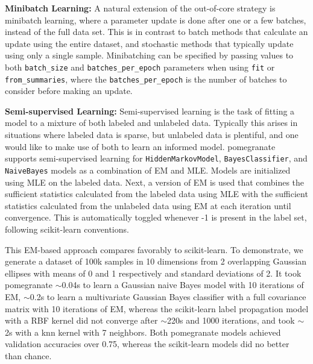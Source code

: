 \documentclass{article}
\newcommand{\code}[1]{\colorbox{light-gray}{\texttt{#1}}}
\begin{document}
\vspace{1em}\noindent\textbf{Minibatch Learning:} A natural extension of the out-of-core strategy is minibatch learning, where a parameter update is done after one or a few batches, instead of the full data set. This is in contrast to batch methods that calculate an update using the entire dataset, and stochastic methods that typically update using only a single sample. Minibatching can be specified by passing values to both \code{batch\_size} and \code{batches\_per\_epoch} parameters when using \code{fit} or \code{from\_summaries}, where the \code{batches\_per\_epoch} is the number of batches to consider before making an update.

\vspace{1em}\noindent\textbf{Semi-supervised Learning:} Semi-supervised learning is the task of fitting a model to a mixture of both labeled and unlabeled data. Typically this arises in situations where labeled data is sparse, but unlabeled data is plentiful, and one would like to make use of both to learn an informed model. pomegranate supports semi-supervised learning for \code{HiddenMarkovModel}, \code{BayesClassifier}, and \code{NaiveBayes} models as a combination of EM and MLE. Models are initialized using MLE on the labeled data. Next, a version of EM is used that combines the sufficient statistics calculated from the labeled data using MLE with the sufficient statistics calculated from the unlabeled data using EM at each iteration until convergence. This is automatically toggled whenever -1 is present in the label set, following scikit-learn conventions. 

This EM-based approach compares favorably to scikit-learn. To demonstrate, we generate a dataset of 100k samples in 10 dimensions from 2 overlapping Gaussian ellipses with means of 0 and 1 respectively and standard deviations of 2. It took pomegranate $\sim$0.04s to learn a Gaussian naive Bayes model with 10 iterations of EM, $\sim$0.2s to learn a multivariate Gaussian Bayes classifier with a full covariance matrix with 10 iterations of EM, whereas the scikit-learn label propagation model with a RBF kernel did not converge after $\sim$220s and 1000 iterations, and took $\sim$2s with a knn kernel with 7 neighbors. Both pomegranate models achieved validation accuracies over 0.75, whereas the scikit-learn models did no better than chance.
\end{document}
